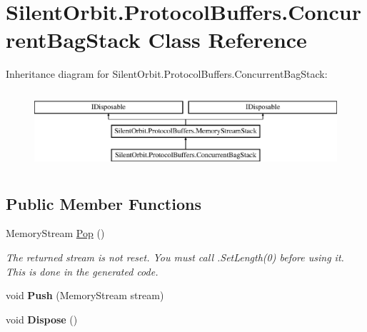 \hypertarget{class_silent_orbit_1_1_protocol_buffers_1_1_concurrent_bag_stack}{}\section{Silent\+Orbit.\+Protocol\+Buffers.\+Concurrent\+Bag\+Stack Class Reference}
\label{class_silent_orbit_1_1_protocol_buffers_1_1_concurrent_bag_stack}
Inheritance diagram for Silent\+Orbit.\+Protocol\+Buffers.\+Concurrent\+Bag\+Stack\+:\begin{figure}[H]
\begin{center}
\leavevmode
\includegraphics[height=2.876712cm]{class_silent_orbit_1_1_protocol_buffers_1_1_concurrent_bag_stack}
\end{center}
\end{figure}
\subsection*{Public Member Functions}
\begin{DoxyCompactItemize}
\item 
Memory\+Stream \hyperlink{class_silent_orbit_1_1_protocol_buffers_1_1_concurrent_bag_stack_adb6ba4bd478a1e11e135cbbe7676ce1d}{Pop} ()
\begin{DoxyCompactList}\small\item\em The returned stream is not reset. You must call .Set\+Length(0) before using it. This is done in the generated code. \end{DoxyCompactList}\item 
\hypertarget{class_silent_orbit_1_1_protocol_buffers_1_1_concurrent_bag_stack_ab262efbb9db8f09224f12ef1e98731df}{}void {\bfseries Push} (Memory\+Stream stream)\label{class_silent_orbit_1_1_protocol_buffers_1_1_concurrent_bag_stack_ab262efbb9db8f09224f12ef1e98731df}

\item 
\hypertarget{class_silent_orbit_1_1_protocol_buffers_1_1_concurrent_bag_stack_aa386d53d821088a236e688f8205b05f8}{}void {\bfseries Dispose} ()\label{class_silent_orbit_1_1_protocol_buffers_1_1_concurrent_bag_stack_aa386d53d821088a236e688f8205b05f8}

\end{DoxyCompactItemize}


